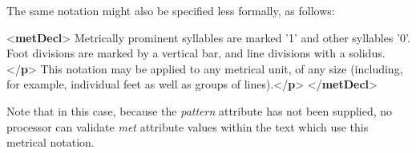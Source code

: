 The same notation might also be specified less formally, as follows: \par\bgroup{}\exampleFont \begin{shaded}\noindent\mbox{}{<\textbf{metDecl}>}\mbox{}\newline 
{}Metrically prominent syllables are marked '1' and other\mbox{}\newline 
\hspace*{1em}\hspace*{1em} syllables '0'. Foot divisions are marked by a vertical bar,\mbox{}\newline 
\hspace*{1em}\hspace*{1em} and line divisions with a solidus.{</\textbf{p}>}\mbox{}\newline 
{}This notation may be applied to any metrical unit, of any\mbox{}\newline 
\hspace*{1em}\hspace*{1em} size (including, for example, individual feet as well as\mbox{}\newline 
\hspace*{1em}\hspace*{1em} groups of lines).{</\textbf{p}>}\mbox{}\newline 
{</\textbf{metDecl}>}\end{shaded}\egroup\par \noindent  Note that in this case, because the {\itshape pattern} attribute has not been supplied, no processor can validate {\itshape met} attribute values within the text which use this metrical notation.\par
